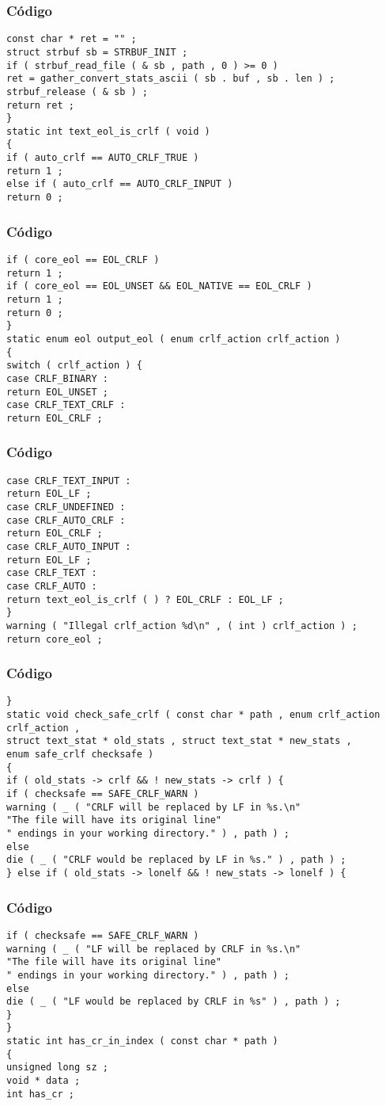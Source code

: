 \documentclass{beamer}
\begin{document}
\begin{frame}[fragile]
\frametitle{C\'odigo}
\begin{verbatim}
const char * ret = "" ; 
struct strbuf sb = STRBUF_INIT ; 
if ( strbuf_read_file ( & sb , path , 0 ) >= 0 ) 
ret = gather_convert_stats_ascii ( sb . buf , sb . len ) ; 
strbuf_release ( & sb ) ; 
return ret ; 
} 
static int text_eol_is_crlf ( void ) 
{ 
if ( auto_crlf == AUTO_CRLF_TRUE ) 
return 1 ; 
else if ( auto_crlf == AUTO_CRLF_INPUT ) 
return 0 ; 
\end{verbatim}
\end{frame}
\begin{frame}[fragile]
\frametitle{C\'odigo}
\begin{verbatim}
if ( core_eol == EOL_CRLF ) 
return 1 ; 
if ( core_eol == EOL_UNSET && EOL_NATIVE == EOL_CRLF ) 
return 1 ; 
return 0 ; 
} 
static enum eol output_eol ( enum crlf_action crlf_action ) 
{ 
switch ( crlf_action ) { 
case CRLF_BINARY : 
return EOL_UNSET ; 
case CRLF_TEXT_CRLF : 
return EOL_CRLF ; 
\end{verbatim}
\end{frame}
\begin{frame}[fragile]
\frametitle{C\'odigo}
\begin{verbatim}
case CRLF_TEXT_INPUT : 
return EOL_LF ; 
case CRLF_UNDEFINED : 
case CRLF_AUTO_CRLF : 
return EOL_CRLF ; 
case CRLF_AUTO_INPUT : 
return EOL_LF ; 
case CRLF_TEXT : 
case CRLF_AUTO : 
return text_eol_is_crlf ( ) ? EOL_CRLF : EOL_LF ; 
} 
warning ( "Illegal crlf_action %d\n" , ( int ) crlf_action ) ; 
return core_eol ; 
\end{verbatim}
\end{frame}
\begin{frame}[fragile]
\frametitle{C\'odigo}
\begin{verbatim}
} 
static void check_safe_crlf ( const char * path , enum crlf_action crlf_action , 
struct text_stat * old_stats , struct text_stat * new_stats , 
enum safe_crlf checksafe ) 
{ 
if ( old_stats -> crlf && ! new_stats -> crlf ) { 
if ( checksafe == SAFE_CRLF_WARN ) 
warning ( _ ( "CRLF will be replaced by LF in %s.\n" 
"The file will have its original line" 
" endings in your working directory." ) , path ) ; 
else 
die ( _ ( "CRLF would be replaced by LF in %s." ) , path ) ; 
} else if ( old_stats -> lonelf && ! new_stats -> lonelf ) { 
\end{verbatim}
\end{frame}
\begin{frame}[fragile]
\frametitle{C\'odigo}
\begin{verbatim}
if ( checksafe == SAFE_CRLF_WARN ) 
warning ( _ ( "LF will be replaced by CRLF in %s.\n" 
"The file will have its original line" 
" endings in your working directory." ) , path ) ; 
else 
die ( _ ( "LF would be replaced by CRLF in %s" ) , path ) ; 
} 
} 
static int has_cr_in_index ( const char * path ) 
{ 
unsigned long sz ; 
void * data ; 
int has_cr ; 
\end{verbatim}
\end{frame}
\end{document}
